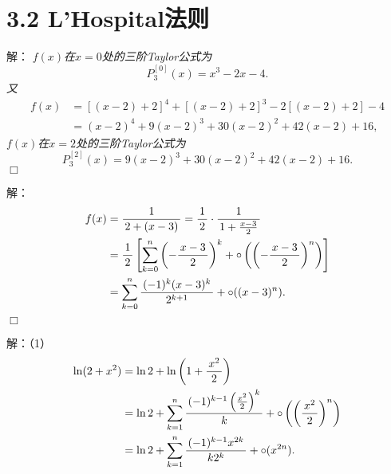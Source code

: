 \section{3.2 L'Hospital法则}

\begin{frame}
	\linespread{1.5}
	\pause

	\bigskip
	
	\small 解： \it 
	$f(x)$在$x=0$处的三阶Taylor公式为
	$$P^{[0]}_3(x)=x^3-2x-4.$$
	\pause 又
	\begin{align*}
		f(x)&=[(x-2)+2]^4+[(x-2)+2]^3-2[(x-2)+2]-4\\
		&=(x-2)^4+9(x-2)^3+30(x-2)^2+42(x-2)+16,
	\end{align*}
	$f(x)$在$x=2$处的三阶Taylor公式为
	$$P^{[2]}_3(x)=9(x-2)^3+30(x-2)^2+42(x-2)+16.$$
	\hfill$\Box$
\end{frame}

\begin{frame}
	\linespread{1.5}
	\pause
	
	\bigskip
	
	\small 解：\it
	\begin{align*}
		f(x)&=\displaystyle\frac{\,{1}\,}{\,{2+(x-3)}\,}=\displaystyle\frac{\,{1}\,}{\,{2}\,}\cdot\displaystyle\frac{\,{1}\,}{\,{1+\frac{x-3}2}\,}\\
		&=\displaystyle\frac{\,{1}\,}{\,{2}\,}\left[\sum\limits_{k=0}^n\left(-\displaystyle\frac{\,{x-3}\,}{\,{2}\,}\right)^k
		+\circ\left(\left(-\displaystyle\frac{\,{x-3}\,}{\,{2}\,}\right)^n\right)\right]\\
		&=\sum\limits_{k=0}^n\displaystyle\frac{\,{(-1)^k(x-3)^k}\,}{\,{2^{k+1}}\,}+\circ((x-3)^n).
	\end{align*}
	\hfill$\Box$
\end{frame}

\begin{frame}
	\linespread{1.5}
	\pause
	
	\bigskip
	
	\small 解：（1）
	\begin{align*}
		\ln(2+x^2)&=\ln2+\ln\left(1+\displaystyle\frac{\,{x^2}\,}{\,{2}\,}\right)\\
		&=\ln2+\sum\limits_{k=1}^n\displaystyle\frac{\,{(-1)^{k-1}\left(\frac{x^2}{2}\right)^k}\,}{\,{k}\,}
		+\circ\left(\left(\displaystyle\frac{\,{x^2}\,}{\,{2}\,}\right)^n\right)\\
		&=\ln2+\sum\limits_{k=1}^n\displaystyle\frac{\,{(-1)^{k-1}x^{2k}}\,}{\,{k2^k}\,}
		+\circ(x^{2n}).
	\end{align*}
\end{frame}

